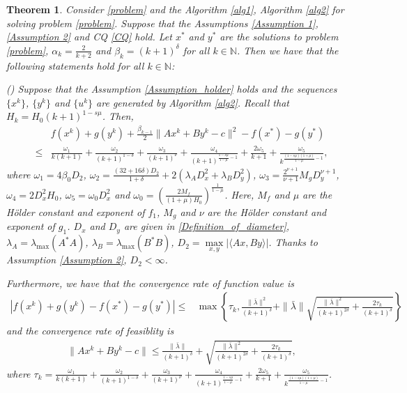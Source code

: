 \documentclass{article}
\numberwithin{equation}{section}
\newtheorem{theorem}{Theorem}[section]
\begin{document}
\begin{theorem} \label{theorem_f+beta_h}
    Consider \eqref{problem} and the Algorithm \ref{alg1}, Algorithm \ref{alg2} for solving problem \eqref{problem}. 
    Suppose that the Assumptions \ref{Assumption 1}, \ref{Assumption 2} 
    and CQ \eqref{CQ} hold. Let $x^*$ and $y^*$ are the solutions to problem \eqref{problem}, 
    $\alpha_k=\frac{2}{k+2}$ and $\beta_{k} =(k+1)^{\delta}$ for all $k\in \mathbb{N}$. 
    Then we have that the following statements hold for all $k\in \mathbb{N}$:

    () Suppose that the Assumption \ref{Assumption_holder} holds and the sequences 
    $\{x^k\}$, $\{y^k\}$ and $\{u^k\}$ are generated by Algorithm \ref{alg2}. Recall that 
    $H_k = H_0(k+1)^{1-s\mu}$. Then, 
    \begin{align}
        &f(x^{k}) + g(y^{k}) +\frac{\beta_{k-1}}{2}\|Ax^k+By^k-c\rVert^2 - f(x^*) -g(y^*)  \nonumber \\
        \leq& \frac{\omega_1}{k(k+1)}+ \frac{\omega_2}{(k+1)^{1-\delta}}+ \frac{\omega_3}{(k+1)^{\nu}} 
        + \frac{\omega_4}{(k+1)^{\frac{1-s\mu}{1-\mu}-1}}+ \frac{2\omega_5}{k+1}+ \frac{\omega_5}{k^{\frac{(1-s\mu)(1+\mu)}{1-\mu}-1}}, 
    \end{align}
    where $\omega_1 = 4\beta_0D_2$, $\omega_2 = \frac{(32+16\delta)D_2}{1+\delta}+ 2(\lambda_AD_x^2+ \lambda_BD_y^2)$, 
    $\omega_3 = \frac{2^{\nu+1}}{\nu+1}M_gD_y^{\nu+1}$, $\omega_4 = 2D_x^2H_0$, $\omega_5 = \omega_0D_x^2$  
    and $\omega_0 = \left(\frac{2M_f}{(1+\mu)H_0}\right)^{\frac{1}{1-\mu}} $. Here, $M_f$ and $\mu$ are the 
    H\"older constant and exponent of $f_1$, $M_g$ and $\nu$ are the H\"older constant and exponent of $g_1$. 
    $D_x$ and $D_y$ are given in \eqref{Definition_of_diameter},    
    $\lambda_{A} =\lambda_{\max}(A^*A)$, $\lambda_{B} = \lambda_{\max}(B^*B)$, $D_2 = \max\limits_{x,y}\left| \langle Ax,By\rangle \right|$.
    Thanks to Assumption \ref{Assumption 2}, $D_2 < \infty$. 

    Furthermore, we have that the convergence rate of function value is 
    \begin{align}
        \left|f(x^k)+ g(y^k) -f(x^*)-g(y^*) \right|
        \leq & \max\left\{ \tau_k, \frac{\|\bar{\lambda}\rVert^2}{(k+1)^{\delta}} + \|\bar{\lambda}\rVert\sqrt{\frac{\|\bar{\lambda}\rVert^2}{(k+1)^{2\delta}}+\frac{2\tau_k}{(k+1)^{\delta}}} \right\}
    \end{align}
    and the convergence rate of feasiblity is  
    \begin{align}
        \|Ax^k+By^k-c\rVert \leq \frac{\|\bar{\lambda}\rVert}{(k+1)^{\delta}} + \sqrt{\frac{\|\bar{\lambda}\rVert^2}{(k+1)^{2\delta}}+\frac{2\tau_k}{(k+1)^{\delta}}}, 
    \end{align}
    where $\tau_k = \frac{\omega_1}{k(k+1)}+ \frac{\omega_2}{(k+1)^{1-\delta}}+ \frac{\omega_3}{(k+1)^{\nu}} 
        + \frac{\omega_4}{(k+1)^{\frac{1-s\mu}{1-\mu}-1}}+ \frac{2\omega_5}{k+1}+ \frac{\omega_5}{k^{\frac{(1-s\mu)(1+\mu)}{1-\mu}-1}}$. 
    

\end{theorem}
\end{document}
